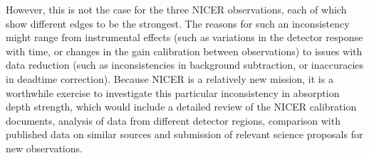 		    However, this is not the case for the three NICER observations, each of which show different edges to be the strongest. The reasons for such an inconsistency might range from instrumental effects (such as variations in the detector response with time, or changes in the gain calibration between observations) to issues with data reduction (such as inconsistencies in background subtraction, or inaccuracies in deadtime correction). Because NICER is a relatively new mission, it is a worthwhile exercise to investigate this particular inconsistency in absorption depth strength, which would include a detailed review of the NICER calibration documents, analysis of data from different detector regions, comparison with published data on similar sources and submission of relevant science proposals for new observations.
		    
	\setcounter{footnotecount}{\value{footnote}}